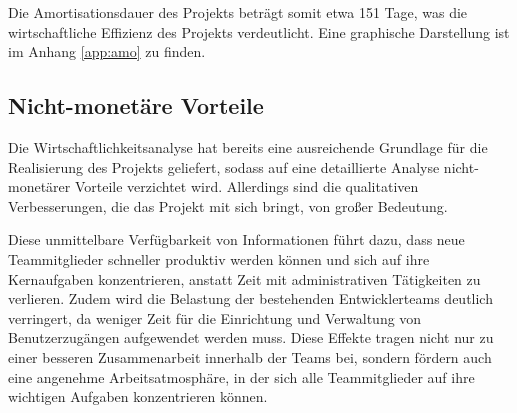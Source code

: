 Die Amortisationsdauer des Projekts beträgt somit etwa 151 Tage, was die wirtschaftliche Effizienz des Projekts verdeutlicht. Eine graphische Darstellung ist im Anhang \ref{app:amo} zu finden.

\subsection{Nicht-monetäre Vorteile}
\label{sec:Nutzwertanalyse}

Die Wirtschaftlichkeitsanalyse hat bereits eine ausreichende Grundlage für die Realisierung des Projekts geliefert, sodass auf eine detaillierte Analyse nicht-monetärer Vorteile verzichtet wird. Allerdings sind die qualitativen Verbesserungen, die das Projekt mit sich bringt, von großer Bedeutung.

Diese unmittelbare Verfügbarkeit von Informationen führt dazu, dass neue Teammitglieder schneller produktiv werden können und sich auf ihre Kernaufgaben konzentrieren, anstatt Zeit mit administrativen Tätigkeiten zu verlieren. Zudem wird die Belastung der bestehenden Entwicklerteams deutlich verringert, da weniger Zeit für die Einrichtung und Verwaltung von Benutzerzugängen aufgewendet werden muss. Diese Effekte tragen nicht nur zu einer besseren Zusammenarbeit innerhalb der Teams bei, sondern fördern auch eine angenehme Arbeitsatmosphäre, in der sich alle Teammitglieder auf ihre wichtigen Aufgaben konzentrieren können.
